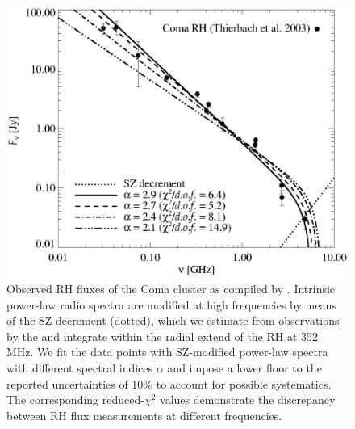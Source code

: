 \documentclass[useAMS,usenatbib]{mn2e}
\begin{document}
\begin{figure} 
\centering
\includegraphics[width=\columnwidth]{figures/SZ_Coma.eps}
\caption{Observed RH fluxes of the Coma cluster as compiled by
  \citet{2003A&A...397...53T}. Intrinsic power-law radio spectra are modified at
  high frequencies by means of the SZ decrement (dotted), which we estimate from
  observations by the \citet{2012arXiv1208.3611P} and integrate within the
  radial extend of the RH at 352 MHz. We fit the data points with SZ-modified
  power-law spectra with different spectral indices $\alpha$ and impose a lower
  floor to the reported uncertainties of 10\% to account for possible
  systematics. The corresponding reduced-$\chi^{2}$ values demonstrate the
  discrepancy between RH flux measurements at different frequencies.}
\label{fig:SZ_Coma}
\end{figure}

\end{document}
